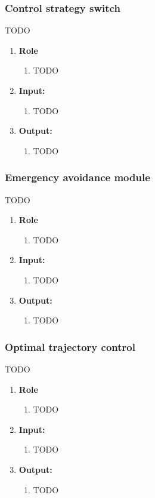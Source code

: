 \subsubsection{Control strategy switch}
TODO
\begin{enumerate}[]
	\item \textbf{Role}
	    \begin{enumerate}[]
		    \item TODO
		\end{enumerate}
	\item \textbf{Input:}
	    \begin{enumerate}[1.]
		\item TODO
		\end{enumerate}	
	\item \textbf{Output:}
	    \begin{enumerate}[1.]
		\item TODO
		\end{enumerate}
\end{enumerate}


\subsubsection{Emergency avoidance module}
TODO
\begin{enumerate}[]
	\item \textbf{Role}
	    \begin{enumerate}[]
		    \item TODO
		\end{enumerate}
	\item \textbf{Input:}
	    \begin{enumerate}[1.]
		\item TODO
		\end{enumerate}	
	\item \textbf{Output:}
	    \begin{enumerate}[1.]
		\item TODO
		\end{enumerate}
\end{enumerate}

\subsubsection{Optimal trajectory control}
TODO
\begin{enumerate}[]
	\item \textbf{Role}
	    \begin{enumerate}[]
		    \item TODO
		\end{enumerate}
	\item \textbf{Input:}
	    \begin{enumerate}[1.]
		\item TODO
		\end{enumerate}	
	\item \textbf{Output:}
	    \begin{enumerate}[1.]
		\item TODO
		\end{enumerate}
\end{enumerate}



